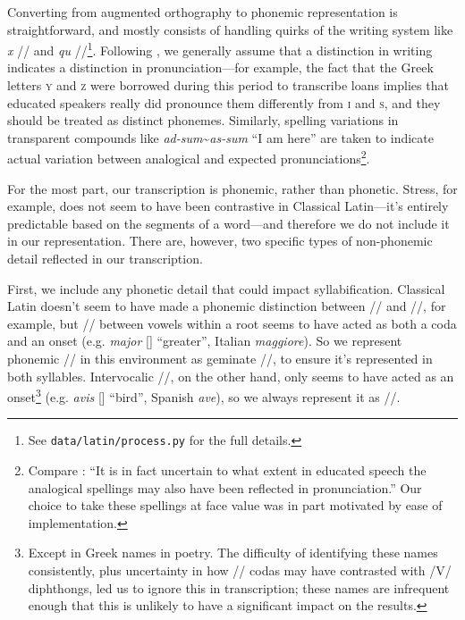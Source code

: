 \documentclass[12pt,twoside]{article}
\newcommand{\ipa}[1]{/\textipa{#1}/}
\newcommand{\ipab}[1]{[\textipa{#1}]}
\begin{document}

Converting from augmented orthography to phonemic representation is straightforward, and mostly consists of handling quirks of the writing system like \emph{x} \ipa{ks} and \emph{qu} \ipa{k\super{w}}\footnote{See \texttt{data/latin/process.py} for the full details.}. Following \citet{allen}, we generally assume that a distinction in writing indicates a distinction in pronunciation---for example, the fact that the Greek letters \textsc{y} and \textsc{z} were borrowed during this period to transcribe loans implies that educated speakers really did pronounce them differently from \textsc{i} and \textsc{s}, and they should be treated as distinct phonemes. Similarly, spelling variations in transparent compounds like \emph{ad-sum}\textasciitilde\emph{as-sum} ``I am here'' are taken to indicate actual variation between analogical and expected pronunciations\footnote{Compare \citet[22]{allen}: ``It is in fact uncertain to what extent in educated speech the analogical spellings may also have been reflected in pronunciation.'' Our choice to take these spellings at face value was in part motivated by ease of implementation.}.

For the most part, our transcription is phonemic, rather than phonetic. Stress, for example, does not seem to have been contrastive in Classical Latin---it's entirely predictable based on the segments of a word---and therefore we do not include it in our representation. There are, however, two specific types of non-phonemic detail reflected in our transcription.

First, we include any phonetic detail that could impact syllabification. Classical Latin doesn't seem to have made a phonemic distinction between \ipa{j} and \ipa{jj}, for example, but \ipa{j} between vowels within a root seems to have acted as both a coda and an onset (e.g. \emph{major} \ipab{maj.jor} ``greater'', Italian \emph{maggiore}). So we represent phonemic \ipa{j} in this environment as geminate \ipa{jj}, to ensure it's represented in both syllables. Intervocalic \ipa{w}, on the other hand, only seems to have acted as an onset\footnote{Except in Greek names in poetry. The difficulty of identifying these names consistently, plus uncertainty in how \ipa{w} codas may have contrasted with /V/ diphthongs, led us to ignore this in transcription; these names are infrequent enough that this is unlikely to have a significant impact on the results.} (e.g. \emph{avis} \ipab{a.wis} ``bird'', Spanish \emph{ave}), so we always represent it as \ipa{w}.
\end{document}

